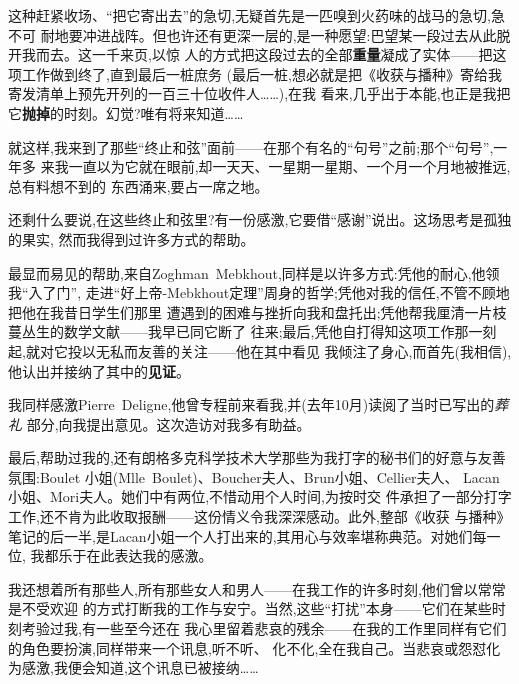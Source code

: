 \pmark{}这种赶紧收场、“把它寄出去”的急切,无疑首先是一匹嗅到火药味的战马的急切,急不可
耐地要冲进战阵。但也许还有更深一层的,是一种愿望:巴望某一段过去从此脱开我而去。这一千来页,以惊
人的方式把这段过去的全部\textbf{重量}凝成了实体——把这项工作做到终了,直到最后一桩庶务
(最后一桩,想必就是把《收获与播种》寄给我寄发清单上预先开列的一百三十位收件人……),在我
看来,几乎出于本能,也正是我把它\textbf{抛掉}的时刻。幻觉?唯有将来知道……

就这样,我来到了那些“终止和弦”面前——在那个有名的“句号”之前;那个“句号”,一年多
来我一直以为它就在眼前,却一天天、一星期一星期、一个月一个月地被推远,总有料想不到的
东西涌来,要占一席之地。

还剩什么要说,在这些终止和弦里?有一份感激,它要借“感谢”说出。这场思考是孤独的果实,
然而我得到过许多方式的帮助。

最显而易见的帮助,来自Zoghman~Mebkhout,同样是以许多方式:凭他的耐心,他领我“入了门”,
走进“好上帝-Mebkhout定理”周身的哲学;凭他对我的信任,不管不顾地把他在我昔日学生们那里
遭遇到的困难与挫折向我和盘托出;凭他帮我厘清一片枝蔓丛生的数学文献——我早已同它断了
往来;最后,凭他自打得知这项工作那一刻起,就对它投以无私而友善的关注——他在其中看见
我倾注了身心,而首先(我相信),他认出并接纳了其中的\textbf{见证}。

我同样感激Pierre~Deligne,他曾专程前来看我,并(去年10月)读阅了当时已写出的\emph{葬礼}
部分,向我提出意见\dmark{}。这次造访对我多有助益。

最后,帮助过我的,还有朗格多克科学技术大学那些为我打字的秘书们的好意与友善氛围:Boulet
小姐(Mlle~Boulet)、Boucher夫人、Brun小姐、Cellier夫人、
Lacan小姐、Mori夫人。她们中有两位,不惜动用个人时间,为按时交
件承担了一部分打字工作,还不肯为此收取报酬——这份情义令我深深感动。此外,整部《收获
与播种》笔记的后一半,是Lacan小姐一个人打出来的,其用心与效率堪称典范。对她们每一位,
我都乐于在此表达我的感激。

我还想着所有那些人,所有那些女人和男人——在我工作的许多时刻,他们曾以常常是不受欢迎
的方式打断我的工作与安宁。当然,这些“打扰”本身——它们在某些时刻考验过我,有一些至今还在
我心里留着悲哀的残余——在我的工作里同样有它们的角色要扮演,同样带来一个讯息,听不听、
化不化,全在我自己。当悲哀或怨怼化为感激,我便会知道,这个讯息已被接纳……

